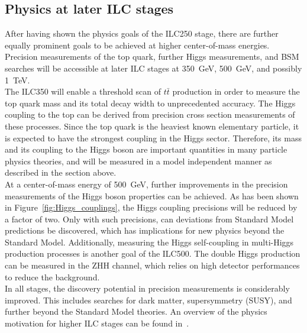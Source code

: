 \subsection{Physics at later ILC stages}
After having shown the physics goals of the ILC250 stage, there are further equally prominent goals to be achieved at higher center-of-mass energies.
Precision measurements of the top quark, further Higgs measurements, and BSM searches will be accessible at later ILC stages at \SI{350}{\GeV}, \SI{500}{\GeV}, and possibly \SI{1}{\TeV}.
\\The ILC350 will enable a threshold scan of $t\bar{t}$ production in order to measure the top quark mass and its total decay width to unprecedented accuracy.
The Higgs coupling to the top can be derived from precision cross section measurements of these processes.
Since the top quark is the heaviest known elementary particle, it is expected to have the strongest coupling in the Higgs sector.
Therefore, its mass and its coupling to the Higgs boson are important quantities in many particle physics theories, and will be measured in a model independent manner as described in the section above.
\\At a center-of-mass energy of \SI{500}{\GeV}, further improvements in the precision measurements of the Higgs boson properties can be achieved.
As has been shown in Figure~\ref{fig:Higgs_couplings}, the Higgs coupling precisions will be reduced by a factor of two.
Only with such precisions, can deviations from Standard Model predictions be discovered, which has implications for new physics beyond the Standard Model.
Additionally, measuring the Higgs self-coupling in multi-Higgs production processes is another goal of the ILC500.
The double Higgs production can be measured in the ZHH channel, which relies on high detector performances to reduce the background.
\\In all stages, the discovery potential in precision measurements is considerably improved.
This includes searches for dark matter, supersymmetry (SUSY), and further beyond the Standard Model theories.
An overview of the physics motivation for higher ILC stages can be found in~\cite{PhysicsCase}.

